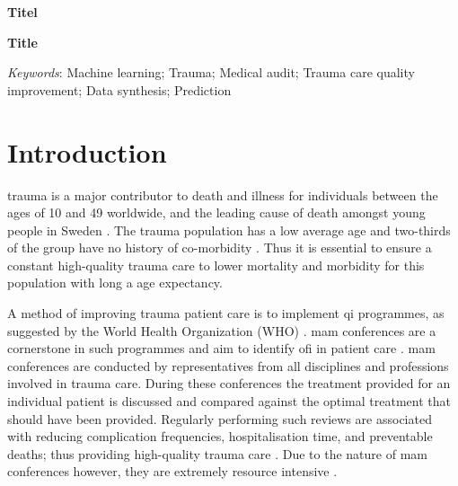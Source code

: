 \documentclass[12pt, letterpaper]{article}
\begin{document}
\begin{titlepage}
    
\end{titlepage}


\textbf{Titel}

\lipsum[1]

\vfill

\textbf{Title}

\lipsum[1]

\vfill

\textit{Keywords}: Machine learning; Trauma; Medical audit; Trauma care quality improvement; Data synthesis; Prediction

\newpage

\glsaddall
\printnoidxglossary[type=acronym,style=csuper]
\printnoidxglossary[style=gsuper]

\newpage
{}


\section{Introduction}
\Gls{trauma} is a major contributor to death and illness for individuals between the ages of 10 and 49 worldwide, and the leading cause of death amongst young people in Sweden \cite{roth_global_2018, vos_global_2020, sos_death_2021}. The \gls{trauma} population has a low average age and two-thirds of the group have no history of co-morbidity \cite{brattstrom_socio-economic_2015}. Thus it is essential to ensure a constant high-quality \gls{trauma} care to lower mortality and morbidity for this population with long a age expectancy.

A method of improving trauma patient care is to implement \acrfull{qi} programmes, as suggested by the World Health Organization (WHO) \cite{world_health_organization_guidelines_2009}. \Acrfull{mam} conferences are a cornerstone in such programmes and aim to identify \acrfull{ofi} in patient care \cite{santana_development_2014}. \acrshort{mam} conferences are conducted by representatives from all disciplines and professions involved in trauma care. During these conferences the treatment provided for an individual patient is discussed and compared against the optimal treatment that should have been provided. Regularly performing such reviews are associated with reducing complication frequencies, hospitalisation time, and preventable deaths; thus providing high-quality trauma care \cite{stelfox_evidence_2011, mcdermott_trauma_1994}. Due to the nature of \acrshort{mam} conferences however, they are extremely resource intensive \cite{}.
\end{document}
